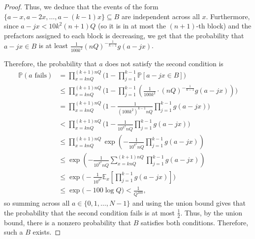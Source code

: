 \documentclass[10pt,a4paper]{amsart}
\begin{document}
\begin{proof}
Thus, we deduce that the events of the form 
$\{a-x, a-2x,\dots,a-(k-1)x\} \subseteq B$ 
are independent across all $x$.
Furthermore, since $a-jx < 10k^2(n+1)Q$
(so it is in at most the $(n+1)$-th block)
and the prefactors assigned to each block is decreasing,
we get that the probability that $a-jx\in B$ is at least 
$\frac 1{100k^2}(nQ)^{-\frac{1}{k-1}}g(a-jx)$. 

Therefore, the probability that $a$ does not 
satisfy the second condition is
\begin{align*}
\mathbb P(a\text{ fails}) 
&= \prod_{x=knQ}^{(k+1)nQ} \Big(1 - \prod_{j=1}^{k-1} 
\mathbb P[a-jx\in B]\Big) \\
&\leq \prod_{x=knQ}^{(k+1)nQ} \Big(1 - \prod_{j=1}^{k-1} 
\left(\frac 1{100k^2}\cdot 
(nQ)^{-\frac 1{k-1}} g(a-jx)\right)\Big) \\
&= \prod_{x=knQ}^{(k+1)nQ} \Big(1 - 
\frac 1{(100k^2)^{k-1} nQ} \prod_{j=1}^{k-1} g(a-jx)\Big) \\
&< \prod_{x=knQ}^{(k+1)nQ} \Big(1 - 
\frac 1{10^{k^2} nQ} \prod_{j=1}^{k-1} g(a-jx)\Big) \\
&\leq \prod_{x=knQ}^{(k+1)nQ}  \exp\left(-\frac 1{10^{k^2}nQ}
\prod_{j=1}^{k-1} g(a-jx) \right) \tag{using $\exp(-x)\geq 1-x$}\\
&\leq \exp\left(-\frac 1{10^{k^2}nQ} \sum_{x=knQ}^{(k+1)nQ}
\prod_{j=1}^{k-1} g(a-jx) \right)\\
&\leq \exp\Big(-\frac 1{10^{k^2}} 
\mathbb E_x \left[\prod_{j=1}^{k-1} g(a-jx)\right]\Big) \\
&\leq \exp\Big(-100\log Q\Big) < \frac 1{Q^{100}},
\end{align*}
so summing across all $a\in \{0,1,\dots,N-1\}$ 
and using the union bound gives 
that the probability that the second condition fails is at most $\frac 12$.
Thus, by the union bound, there is a nonzero probability
that $B$ satisfies both conditions.
Therefore, such a $B$ exists.
\end{proof}
\end{document}
